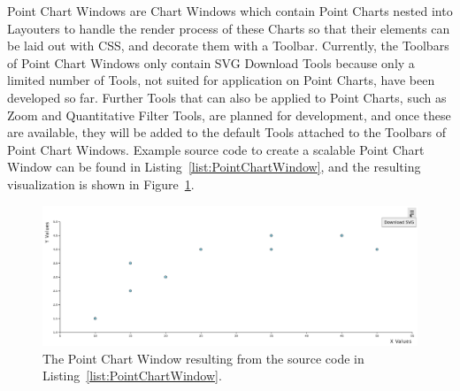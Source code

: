 Point Chart Windows are Chart Windows which contain Point Charts
nested into Layouters to handle the render process of these Charts so
that their elements can be laid out with CSS, and decorate them with a
Toolbar. Currently, the Toolbars of Point Chart Windows only contain
SVG Download Tools because only a limited number of Tools, not suited
for application on Point Charts, have been developed so far. Further
Tools that can also be applied to Point Charts, such as Zoom and
Quantitative Filter Tools, are planned for development, and once these
are available, they will be added to the default Tools attached to the
Toolbars of Point Chart Windows. Example source code to create a
scalable Point Chart Window can be found in
Listing~\ref{list:PointChartWindow}, and the resulting visualization
is shown in Figure~\ref{fig:PointChartWindow}.



\begin{figure}[tp]
\centering
\includegraphics[keepaspectratio,width=\linewidth,height=\halfh]
{images/point-chart-window.png}
\caption[Point Chart Window Example]{%
The Point Chart Window resulting from the source code in
Listing~\ref{list:PointChartWindow}.
}
\label{fig:PointChartWindow}
\end{figure}
  
